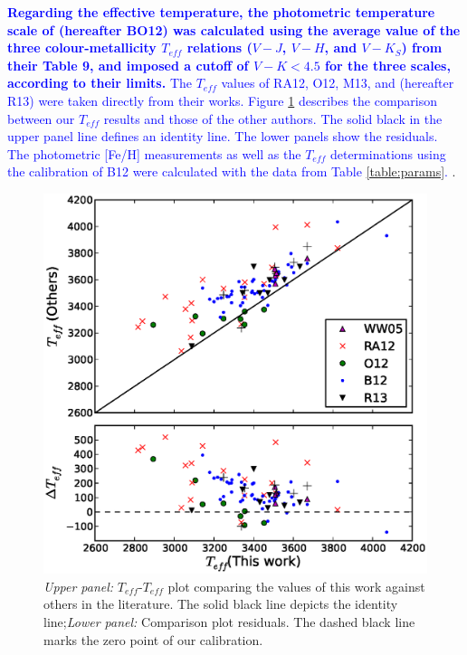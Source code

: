 \documentclass{aa}
\begin{document}
\textcolor{blue}{\textbf{Regarding the effective temperature, the photometric temperature scale of \citet{Boyajian-2012} (hereafter BO12) was calculated using the average value of the three colour-metallicity $T_{eff}$ relations ($V-J$, $V-H$, and $V-K_{S}$) from their Table 9, and imposed a cutoff of $V-K < 4.5$ for the three scales, according to their limits.}  %
\textcolor{blue}{The $T_{eff}$ values of RA12, O12, M13, and \citet{Rajpurohit-2013a} (hereafter R13) were taken directly from their works. Figure \ref{fig:compteff} describes the comparison between our $T_{eff}$ results and those of the other authors. The solid black in the upper panel line defines an identity line. The lower panels show the residuals.} %
The photometric [Fe/H] measurements as well as the $T_{eff}$ determinations using the calibration of B12 were calculated with the data from Table \ref{table:params}. 
}.

\begin{figure}[h!]
\begin{center}
\includegraphics[scale=0.5]{pics/compteffv3.eps}
\end{center}
\caption{\textit{Upper panel:} $T_{eff}$-$T_{eff}$ plot comparing the values of this work against others in the literature. The solid black line depicts the identity line;\textit{Lower panel:} Comparison plot residuals. The dashed black line marks the zero point of our calibration.}
\label{fig:compteff}
\end{figure}
\end{document}
